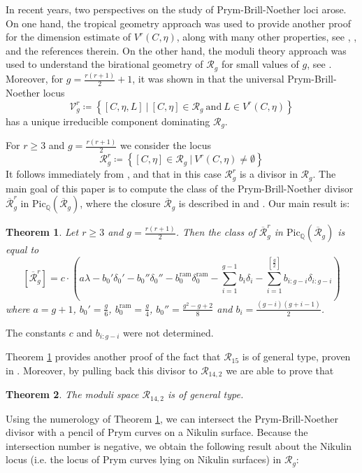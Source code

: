 \documentclass{article}
\theoremstyle{plain}
\newtheorem{trm}{Theorem}[section]
\theoremstyle{definition}
\def\cR{\mathcal{R}}
\def\rr{\overline{\mathcal{R}}}
\begin{document}
In recent years, two perspectives on the study of Prym-Brill-Noether loci arose. On one hand, the tropical geometry approach was used to provide another proof for the dimension estimate of $V^r(C,\eta)$, along with many other properties, see \cite{tropicalPBN-4authors}, \cite{tropicalPBN-Len_Ulirsch}, \cite{JensenPaynesurvey} and the references therein. On the other hand, the moduli theory approach was used to understand the birational geometry of $\cR_g$ for small values of $g$, see \cite{FarVerNikulin}. Moreover, for $g = \frac{r(r+1)}{2} +1$, it was shown in \cite{BudPrymIrr} that the universal Prym-Brill-Noether locus 
\[ \mathcal{V}^r_g\coloneqq \left\{[C,\eta,L] \ | \ [C,\eta]\in \mathcal{R}_g \ \mathrm{and} \ L \in V^r(C,\eta)\right\}\]
has a unique irreducible component dominating $\cR_g$.  

For $r\geq 3$ and $ g = \frac{r(r+1)}{2}$ we consider the locus 
\[ \cR^r_g \coloneqq \left\{ [C,\eta] \in \cR_g \ | \ V^r(C,\eta) \neq \emptyset \right\} \]
It follows immediately from \cite[Theorem II]{FultonLazarsfConnected}, \cite[Example 1.4]{DebarreLefschetz} and \cite[Theorem 2.9]{Steffen} that in this case $\cR^r_g$ is a divisor in $\cR_g$. The main goal of this paper is to compute the class of the Prym-Brill-Noether divisor $\rr^r_g$ in $\mathrm{Pic}_\mathbb{Q}(\rr_g)$, where the closure $\rr_g$ is described in \cite{Casa} and \cite{FarLud}. Our main result is: 

\begin{trm} \label{maintrm} Let $r \geq 3 $ and $g = \frac{r(r+1)}{2}$. Then the class of $\rr^r_g$ in $\mathrm{Pic}_\mathbb{Q}(\rr_g)$ is equal to 
\[ [\rr^r_g] = c\cdot (a\lambda- b_0'\delta_0' - b_0''\delta_0''-b_0^{\mathrm{ram}}\delta_0^{\mathrm{ram}}- \sum_{i=1}^{g-1}b_i\delta_i - \sum_{i = 1}^{[\frac{g}{2}]}b_{i:g-i}\delta_{i:g-i}) \]
where $a = g+1$, $b_0' = \frac{g}{6}$, $b_0^{\mathrm{ram}} = \frac{g}{4}$, $b_0'' = \frac{g^2-g+2}{8}$ and $b_i = \frac{(g-i)(g+i-1)}{2}$.
\end{trm}
The constants $c$ and $b_{i:g-i}$ were not determined.

Theorem \ref{maintrm} provides another proof of the fact that $\cR_{15}$ is of general type, proven in \cite{Bruns}. Moreover, by pulling back this divisor to $\cR_{14,2}$ we are able to prove that

\begin{trm} \label{Kodaira} The moduli space $\mathcal{R}_{14,2}$ is of general type. 
\end{trm}

Using the numerology of Theorem \ref{maintrm}, we can intersect the Prym-Brill-Noether divisor with a pencil of Prym curves on a Nikulin surface. Because the intersection number is negative, we obtain the following result about the Nikulin locus (i.e. the locus of Prym curves lying on Nikulin surfaces) in $\mathcal{R}_g$:
\end{document}
